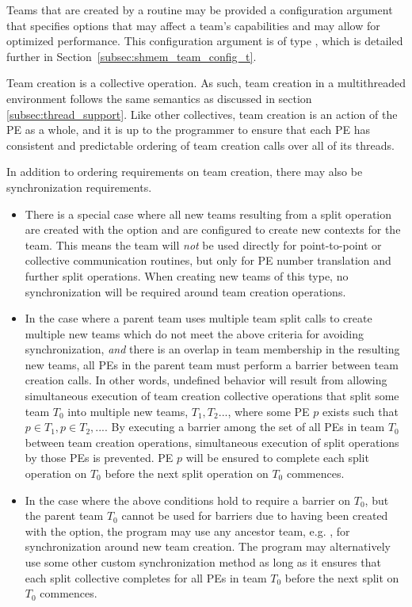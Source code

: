 Teams that are created by a  routine may be
provided a configuration argument that specifies options that may affect
a team's capabilities and may allow for optimized performance.
This configuration argument is of type , which
is detailed further in Section~\ref{subsec:shmem_team_config_t}.

Team creation is a collective operation. As such, team creation in a
multithreaded environment follows the same semantics as discussed in section
\ref{subsec:thread_support}. Like other collectives, team creation is an action
of the \ac{PE} as a whole, and it is up to the programmer to ensure that each
\ac{PE} has consistent and predictable ordering of team creation calls over
all of its threads.

In addition to ordering requirements on team creation, there may also be
synchronization requirements.
\begin{itemize}
\item There is a special case where all new teams resulting from a split operation are
created with the  option and are configured
to create  new contexts for the team. This means the team will \emph{not} be used
directly for point-to-point or collective communication routines, but only for
\ac{PE} number translation and further split operations. When creating new teams
of this type, no synchronization will be required around team creation operations.
\item In the case where a parent team uses multiple team split calls to create
multiple new teams which do not meet the above criteria for avoiding synchronization,
\emph{and} there is an overlap in team membership in the resulting new teams, all \acp{PE}
in the parent team must perform a barrier between team creation calls.
In other words, undefined behavior will result from allowing simultaneous execution of team
creation collective operations that split some team $T_0$ into multiple new
teams, $T_1, T_2...$, where some \ac{PE} $p$ exists such that $p \in T_1, p \in T_2, ...$.
By executing a barrier among the set of
all \acp{PE} in team $T_0$ between team creation operations, simultaneous execution
of split operations by those \acp{PE} is prevented. \ac{PE} $p$ will be ensured to
complete each split operation on $T_0$ before the next split operation on $T_0$ commences.
\item In the case where the above conditions hold to require a barrier on $T_0$,
but the parent team $T_0$ cannot be used for barriers due to having
been created with the  option, the program may use any
ancestor team, e.g. , for synchronization around new
team creation. The program may alternatively use some other custom synchronization method
as long as it ensures that each split collective completes for all \acp{PE}
in team $T_0$ before the next split on $T_0$ commences.
\end{itemize}

